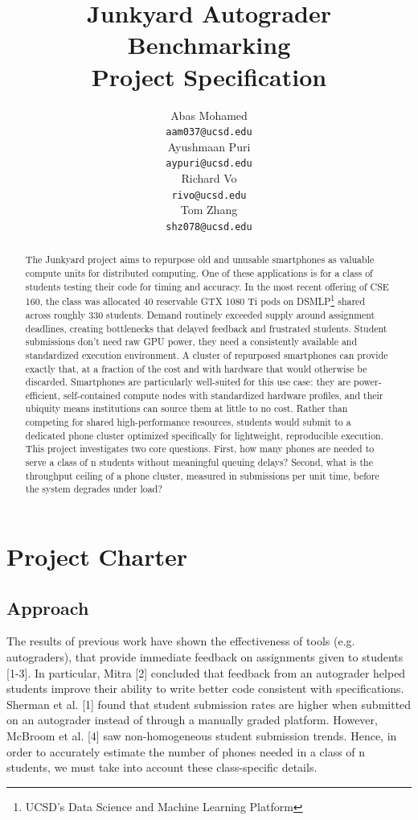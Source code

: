 \documentclass{article}
\title{Junkyard Autograder Benchmarking \\ \large Project Specification}
\author{
  Abas Mohamed \\
  \texttt{aam037@ucsd.edu} \\
  \And
  Ayushmaan Puri \\
  \texttt{aypuri@ucsd.edu} \\
  \And
  Richard Vo \\
  \texttt{rivo@ucsd.edu} \\
  \And
  Tom Zhang \\
  \texttt{shz078@ucsd.edu} \\
}
\begin{document}
\maketitle


\begin{abstract}
The Junkyard project aims to repurpose old and unusable smartphones as valuable compute units for distributed computing. One of these applications is for a class of students testing their code for timing and accuracy. In the most recent offering of CSE 160, the class was allocated 40 reservable GTX 1080 Ti pods on DSMLP\footnote{UCSD's Data Science and Machine Learning Platform} shared across roughly 330 students. Demand routinely exceeded supply around assignment deadlines, creating bottlenecks that delayed feedback and frustrated students. Student submissions don't need raw GPU power, they need a consistently available and standardized execution environment. A cluster of repurposed smartphones can provide exactly that, at a fraction of the cost and with hardware that would otherwise be discarded. Smartphones are particularly well-suited for this use case: they are power-efficient, self-contained compute nodes with standardized hardware profiles, and their ubiquity means institutions can source them at little to no cost. Rather than competing for shared high-performance resources, students would submit to a dedicated phone cluster optimized specifically for lightweight, reproducible execution. This project investigates two core questions. First, how many phones are needed to serve a class of n students without meaningful queuing delays? Second, what is the throughput ceiling of a phone cluster, measured in submissions per unit time, before the system degrades under load?
\end{abstract}



\section{Project Charter}


\subsection{Approach}
The results of previous work have shown the effectiveness of tools (e.g. autograders), that provide immediate feedback on assignments given to students [1-3]. In particular, Mitra [2] concluded that feedback from an autograder helped students improve their ability to write better code consistent with specifications. Sherman et al. [1] found that student submission rates are higher when submitted on an autograder instead of through a manually graded platform. However, McBroom et al. [4] saw non-homogeneous student submission trends. Hence, in order to accurately estimate the number of phones needed in a class of n students, we must take into account these class-specific details.
\end{document}
